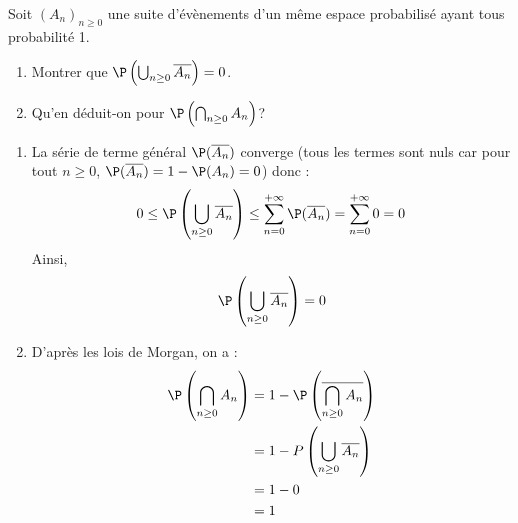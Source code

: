 \documentclass[a4paper,10pt]{report}
\begin{document}
\begin{Exa} Soit $(A_n)_{n \geq 0}$ une suite d'évènements d'un même espace probabilisé ayant tous probabilité 1. 
 
 \begin{enumerate}
 \item Montrer que $\P \left( \bigcup_{n \geq 0} \overline{A_n} \right) = 0$.
 \item Qu'en déduit-on pour $\P \left( \bigcap_{n \geq 0} A_n \right)$?
 \end{enumerate}
 \end{Exa}
 
 \corr 
 
 \begin{enumerate}
 \item La série de terme général $\P( \overline{A_n})$ converge (tous les termes sont nuls car pour tout $n \geq 0$, $\P( \overline{A_n})= 1- \P(A_n)=0$) donc :
 $$ 0 \leq \P \left( \bigcup_{n \geq 0} \overline{A_n} \right) \leq \sum_{n=0}^{+ \infty} \P( \overline{A_n})  = \sum_{n=0}^{+ \infty} 0 = 0$$
 Ainsi,
 $$ \P \left( \bigcup_{n \geq 0} \overline{A_n} \right)=0$$
 \item D'après les lois de Morgan, on a :
 \begin{align*}
 \P \left( \bigcap_{n \geq 0} A_n \right) & = 1 - \P \left( \overline{\bigcap_{n \geq 0} A_n} \right) \\
 &= 1 - P \left( \bigcup_{n \geq 0} \overline{A_n} \right) \\
 & =1-0 \\
 & = 1
 \end{align*}
 \end{enumerate}
\end{document}
